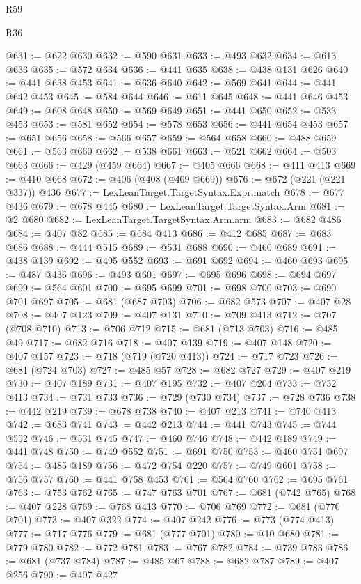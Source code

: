 \begin{lexlean}{R59}
\begin{lexlean}{R36}
\begin{coremodule}
{{{{{{{{{{{{{{{{{{{{{{{{{{{{{{{{{{{{{{{{{{{{{{{{{{{{{{{{{{{{{{{{{{{{{{{{{{{{{{{{{{@631 := @622 @630
@632 := @590 @631
@633 := @493 @632
@634 := @613 @633
@635 := @572 @634
@636 := @441 @635
@638 := @438 @131 @626
@640 := @441 @638 @453
@641 := @636 @640
@642 := @569 @641
@644 := @441 @642 @453
@645 := @584 @644
@646 := @611 @645
@648 := @441 @646 @453
@649 := @608 @648
@650 := @569 @649
@651 := @441 @650
@652 := @533 @453
@653 := @581 @652
@654 := @578 @653
@656 := @441 @654 @453
@657 := @651 @656
@658 := @566 @657
@659 := @564 @658
@660 := @488 @659
@661 := @563 @660
@662 := @538 @661
@663 := @521 @662
@664 := @503 @663
@666 := @429 (@459 @664)
@667 := @405 @666
@668 := @411 @413
@669 := @410 @668
@672 := @406 (@408 (@409 @669))
@676 := @672 (@221 (@221 @337)) @436
@677 := LexLeanTarget.TargetSyntax.Expr.match
@678 := @677 @436
@679 := @678 @445
@680 := LexLeanTarget.TargetSyntax.Arm
@681 := @2 @680
@682 := LexLeanTarget.TargetSyntax.Arm.arm
@683 := @682 @486
@684 := @407 @82
@685 := @684 @413
@686 := @412 @685
@687 := @683 @686
@688 := @444 @515
@689 := @531 @688
@690 := @460 @689
@691 := @438 @139
@692 := @495 @552
@693 := @691 @692
@694 := @460 @693
@695 := @487 @436
@696 := @493 @601
@697 := @695 @696
@698 := @694 @697
@699 := @564 @601
@700 := @695 @699
@701 := @698 @700
@703 := @690 @701 @697
@705 := @681 (@687 @703)
@706 := @682 @573
@707 := @407 @28
@708 := @407 @123
@709 := @407 @131
@710 := @709 @413
@712 := @707 (@708 @710)
@713 := @706 @712
@715 := @681 (@713 @703)
@716 := @485 @49
@717 := @682 @716
@718 := @407 @139
@719 := @407 @148
@720 := @407 @157
@723 := @718 (@719 (@720 @413))
@724 := @717 @723
@726 := @681 (@724 @703)
@727 := @485 @57
@728 := @682 @727
@729 := @407 @219
@730 := @407 @189
@731 := @407 @195
@732 := @407 @204
@733 := @732 @413
@734 := @731 @733
@736 := @729 (@730 @734)
@737 := @728 @736
@738 := @442 @219
@739 := @678 @738
@740 := @407 @213
@741 := @740 @413
@742 := @683 @741
@743 := @442 @213
@744 := @441 @743
@745 := @744 @552
@746 := @531 @745
@747 := @460 @746
@748 := @442 @189
@749 := @441 @748
@750 := @749 @552
@751 := @691 @750
@753 := @460 @751 @697
@754 := @485 @189
@756 := @472 @754 @220
@757 := @749 @601
@758 := @756 @757
@760 := @441 @758 @453
@761 := @564 @760
@762 := @695 @761
@763 := @753 @762
@765 := @747 @763 @701
@767 := @681 (@742 @765)
@768 := @407 @228
@769 := @768 @413
@770 := @706 @769
@772 := @681 (@770 @701)
@773 := @407 @322
@774 := @407 @242
@776 := @773 (@774 @413)
@777 := @717 @776
@779 := @681 (@777 @701)
@780 := @10 @680
@781 := @779 @780
@782 := @772 @781
@783 := @767 @782
@784 := @739 @783
@786 := @681 (@737 @784)
@787 := @485 @67
@788 := @682 @787
@789 := @407 @256
@790 := @407 @427
}}}}}}}}}}}}}}}}}}}}}}}}}}}}}}}}}}}}}}}}}}}}}}}}}}}}}}}}}}}}}}}}}}}}}}}}}}}}}}}}}}
\end{coremodule}
\end{lexlean}
\end{lexlean}
